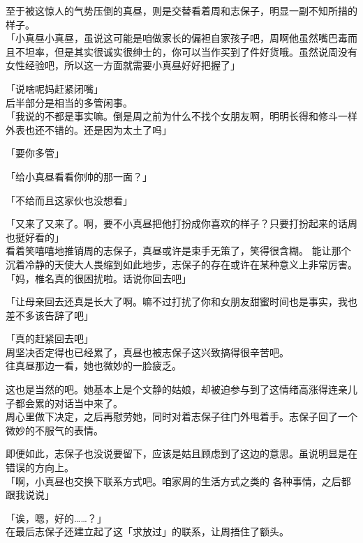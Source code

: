 至于被这惊人的气势压倒的真昼，则是交替看着周和志保子，明显一副不知所措的样子。\\

「小真昼小真昼，虽说这可能是咱做家长的偏袒自家孩子吧，周啊他虽然嘴巴毒而且不坦率，但是其实很诚实很绅士的，你可以当作买到了件好货哦。虽然说周没有女性经验吧，所以这一方面就需要小真昼好好把握了」

「说啥呢妈赶紧闭嘴」\\

后半部分是相当的多管闲事。\\

「我说的不都是事实嘛。倒是周之前为什么不找个女朋友啊，明明长得和修斗一样外表也还不错的。还是因为太土了吗」

「要你多管」

「给小真昼看看你帅的那一面？」

「不给而且这家伙也没想看」

「又来了又来了。啊，要不小真昼把他打扮成你喜欢的样子？只要打扮起来的话周也挺好看的」\\

看着笑嘻嘻地推销周的志保子，真昼或许是束手无策了，笑得很含糊。
能让那个沉着冷静的天使大人畏缩到如此地步，志保子的存在或许在某种意义上非常厉害。\\

「妈，椎名真的很困扰啦。话说你回去吧」

「让母亲回去还真是长大了啊。嘛不过打扰了你和女朋友甜蜜时间也是事实，我也差不多该告辞了吧」

「真的赶紧回去吧」\\

周坚决否定得也已经累了，真昼也被志保子这兴致搞得很辛苦吧。\\

往真昼那边一看，她也微妙的一脸疲乏。

这也是当然的吧。她基本上是个文静的姑娘，却被迫参与到了这情绪高涨得连亲儿子都会累的对话当中来了。\\

周心里做下决定，之后再慰劳她，同时对着志保子往门外甩着手。志保子回了一个微妙的不服气的表情。

即便如此，志保子也没说要留下，应该是姑且顾虑到了这边的意思。虽说明显是在错误的方向上。\\

「啊，小真昼也交换下联系方式吧。咱家周的生活方式之类的 各种事情，之后都跟我说说」

「诶，嗯，好的……？」\\

在最后志保子还建立起了这「求放过」的联系，让周捂住了额头。\\


